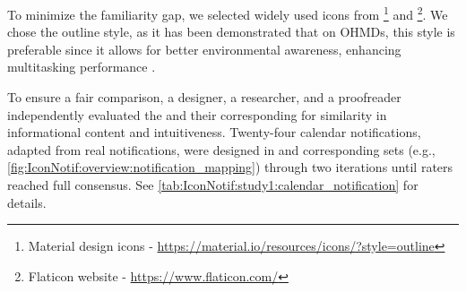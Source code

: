 To minimize the familiarity gap, we selected widely used icons from \materialIcons{}\footnote{Material design icons - \url{https://material.io/resources/icons/?style=outline}} and \flatIcons{}\footnote{Flaticon website - \url{https://www.flaticon.com/}}. We chose the outline style, as it has been demonstrated that on OHMDs, this style is preferable since it allows for better environmental awareness, enhancing multitasking performance \cite{ram_lsvp_2021}.

To ensure a fair comparison, a designer, a researcher, and a proofreader independently evaluated the  and their corresponding  for similarity in informational content and intuitiveness. Twenty-four calendar notifications, adapted from real notifications, were designed in \textnotif{} and corresponding \iconnotif{} sets (e.g., \autoref{fig:IconNotif:overview:notification_mapping}) through two iterations until raters reached full consensus. See \autoref{tab:IconNotif:study1:calendar_notification} for details.


